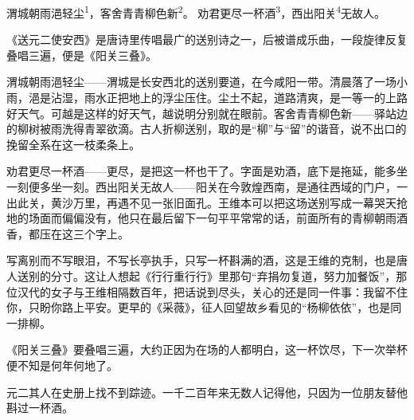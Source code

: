 
\begin{poem}
渭城朝雨浥轻尘\textsuperscript{1}，客舍青青柳色新\textsuperscript{2}。
劝君更尽一杯酒\textsuperscript{3}，西出阳关\textsuperscript{4}无故人。
\end{poem}

\begin{annotations}
\end{annotations}

\begin{appreciation}
《送元二使安西》是唐诗里传唱最广的送别诗之一，后被谱成乐曲，一段旋律反复叠唱三遍，便是《阳关三叠》。

渭城朝雨浥轻尘——渭城是长安西北的送别要道，在今咸阳一带。清晨落了一场小雨，浥是沾湿，雨水正把地上的浮尘压住。尘土不起，道路清爽，是一等一的上路好天气。可越是这样的好天气，越说明分别就在眼前。客舍青青柳色新——驿站边的柳树被雨洗得青翠欲滴。古人折柳送别，取的是“柳”与“留”的谐音，说不出口的挽留全系在这一枝柔条上。

劝君更尽一杯酒——更尽，是把这一杯也干了。字面是劝酒，底下是拖延，能多坐一刻便多坐一刻。西出阳关无故人——阳关在今敦煌西南，是通往西域的门户，一出此关，黄沙万里，再遇不见一张旧面孔。王维本可以把这场送别写成一幕哭天抢地的场面而偏偏没有，他只在最后留下一句平平常常的话，前面所有的青柳朝雨酒香，都压在这三个字上。

写离别而不写眼泪，不写长亭执手，只写一杯斟满的酒，这是王维的克制，也是唐人送别的分寸。这让人想起《行行重行行》里那句“弃捐勿复道，努力加餐饭”，那位汉代的女子与王维相隔数百年，把话说到尽头，关心的还是同一件事：我留不住你，只盼你路上平安。更早的《采薇》，征人回望故乡看见的“杨柳依依”，也是同一排柳。

《阳关三叠》要叠唱三遍，大约正因为在场的人都明白，这一杯饮尽，下一次举杯便不知是何年何地了。

元二其人在史册上找不到踪迹。一千二百年来无数人记得他，只因为一位朋友替他斟过一杯酒。
\end{appreciation}
